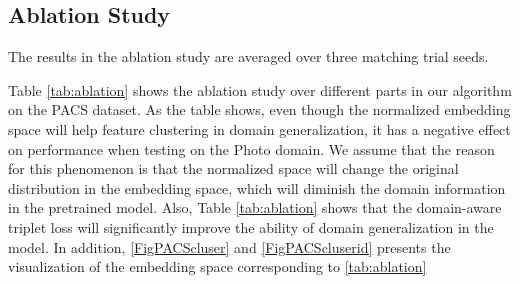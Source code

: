 \documentclass[a4paper,fleqn]{cas-dc}
\begin{document}
\subsection{Ablation Study}
The results in the ablation study are averaged over three matching trial seeds.\par
\begin{table}[h]
    \centering
    \caption{Ablation study over our algorithm on PACS.}
    \label{tab:ablation}
\end{table}
Table \ref{tab:ablation} shows the ablation study over different parts in our algorithm on the PACS dataset.  As the table shows, even though the normalized embedding space will help feature clustering in domain generalization, it has a negative effect on performance when testing on the Photo domain. We assume that the reason for this phenomenon is that the normalized space will change the original distribution in the embedding space, which will diminish the domain information in the pretrained model.  Also, Table \ref{tab:ablation} shows that the domain-aware triplet loss will significantly improve the ability of domain generalization in the model. In addition, \ref{FigPACScluser} and \ref{FigPACScluserid} presents the visualization of the embedding space corresponding to \ref{tab:ablation}\par
\begin{table}[h]
    \centering
    \caption{Ablation study over normalized embedding space on PACS.}
    \label{tab:ablation2}
\end{table}
\end{document}

